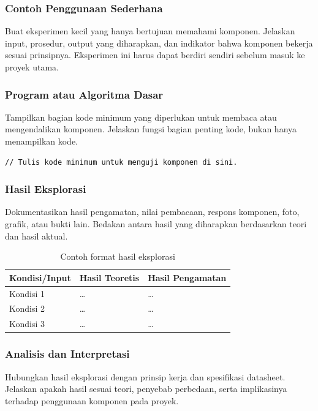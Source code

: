 \subsubsection{Contoh Penggunaan Sederhana}
Buat eksperimen kecil yang hanya bertujuan memahami komponen. Jelaskan
input, prosedur, output yang diharapkan, dan indikator bahwa komponen bekerja
sesuai prinsipnya. Eksperimen ini harus dapat berdiri sendiri sebelum masuk
ke proyek utama.

\subsubsection{Program atau Algoritma Dasar}
Tampilkan bagian kode minimum yang diperlukan untuk membaca atau mengendalikan
komponen. Jelaskan fungsi bagian penting kode, bukan hanya menampilkan kode.

\begin{lstlisting}[caption={Contoh program dasar komponen}]
// Tulis kode minimum untuk menguji komponen di sini.
\end{lstlisting}

\subsubsection{Hasil Eksplorasi}
Dokumentasikan hasil pengamatan, nilai pembacaan, respons komponen, foto,
grafik, atau bukti lain. Bedakan antara hasil yang diharapkan berdasarkan
teori dan hasil aktual.

\begin{table}[H]
\centering
\caption{Contoh format hasil eksplorasi}
\begin{tabularx}{\textwidth}{@{}lXX@{}}
\toprule
Kondisi/Input & Hasil Teoretis & Hasil Pengamatan \\
\midrule
Kondisi 1 & \dots & \dots \\
Kondisi 2 & \dots & \dots \\
Kondisi 3 & \dots & \dots \\
\bottomrule
\end{tabularx}
\end{table}

\subsubsection{Analisis dan Interpretasi}
Hubungkan hasil eksplorasi dengan prinsip kerja dan spesifikasi datasheet.
Jelaskan apakah hasil sesuai teori, penyebab perbedaan, serta implikasinya
terhadap penggunaan komponen pada proyek.

